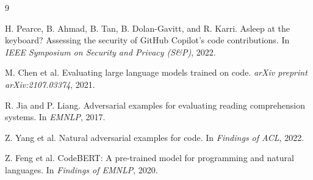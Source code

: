 \documentclass[11pt]{article}
\begin{document}

\begin{thebibliography}{9}

H. Pearce, B. Ahmad, B. Tan, B. Dolan-Gavitt, and R. Karri.
\newblock Asleep at the keyboard? Assessing the security of GitHub Copilot's code contributions.
\newblock In \textit{IEEE Symposium on Security and Privacy (S\&P)}, 2022.

M. Chen et al.
\newblock Evaluating large language models trained on code.
\newblock \textit{arXiv preprint arXiv:2107.03374}, 2021.

R. Jia and P. Liang.
\newblock Adversarial examples for evaluating reading comprehension systems.
\newblock In \textit{EMNLP}, 2017.

Z. Yang et al.
\newblock Natural adversarial examples for code.
\newblock In \textit{Findings of ACL}, 2022.

Z. Feng et al.
\newblock CodeBERT: A pre-trained model for programming and natural languages.
\newblock In \textit{Findings of EMNLP}, 2020.

\end{thebibliography}
\end{document}
